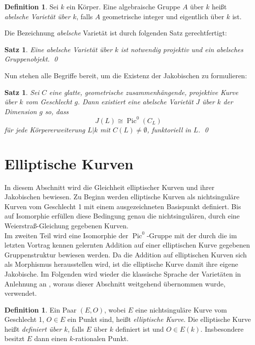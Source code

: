 \documentclass{amsart}
\theoremstyle{plain}
\newtheorem{proposition}[subsection]{Satz}
\theoremstyle{definition}
\newtheorem{definition}[subsection]{Definition}
\newcommand{\pic}{\operatorname{Pic}}
\begin{document}
\begin{definition}
	Sei $k$ ein Körper. Eine algebraische Gruppe $A$ über $k$ heißt {\it abelsche Varietät über $k$}, falls $A$ geometrische integer und eigentlich über $k$ ist.
\end{definition}

\noindent Die Bezeichnung {\it abelsche} Varietät ist durch folgenden Satz gerechtfertigt:
\begin{proposition}
	Eine abelsche Varietät über $k$ ist notwendig projektiv und ein abelsches Gruppenobjekt. \qed
\end{proposition}

Nun stehen alle Begriffe bereit, um die Existenz der Jakobischen zu formulieren:
\begin{proposition}
	Sei $C$ eine glatte, geometrische zusammenhängende, projektive Kurve über $k$ vom Geschlecht $g$. Dann existiert eine abelsche Varietät $J$ über $k$ der Dimension $g$ so, dass 
	\begin{equation*}
		J(L) \cong \pic^0(C_L)
	\end{equation*}
	für jede Körpererweiterung $L | k$ mit $C(L) \neq \emptyset$, funktoriell in $L$. \qed
\end{proposition}




\section{Elliptische Kurven}
\label{section-elliptische-kurven}

In diesem Abschnitt wird die Gleichheit elliptischer Kurven und ihrer Jakobischen bewiesen.
Zu Beginn werden elliptische Kurven als nichtsinguläre Kurven vom Geschlecht 1 mit einem ausgezeichneten Basispunkt definiert.
Bis auf Isomorphie erfüllen diese Bedingung genau die nichtsingulären, durch eine Weierstraß-Gleichung gegebenen Kurven. \\
Im zweiten Teil wird eine Isomorphie der $\pic^0$-Gruppe mit der durch die im letzten Vortrag kennen gelernten Addition auf einer elliptischen Kurve gegebenen Gruppenstruktur bewiesen werden.
Da die Addition auf elliptischen Kurven sich als Morphismus herausstellen wird, ist die elliptische Kurve damit ihre eigene Jakobische.
Im Folgenden wird wieder die klassische Sprache der Varietäten in Anlehnung an \cite{silverman}, woraus dieser Abschnitt weitgehend übernommen wurde, verwendet.

\begin{definition}
	Ein Paar $(E, O)$, wobei $E$ eine nichtsinguläre Kurve vom Geschlecht 1, $O \in E$ ein Punkt sind, heißt {\it elliptische Kurve}.
	Die elliptische Kurve heißt {\it definiert über $k$}, falls $E$ über $k$ definiert ist und $O \in E(k)$. Insbesondere besitzt $E$ dann einen $k$-rationalen Punkt.
\end{definition}
\end{document}
